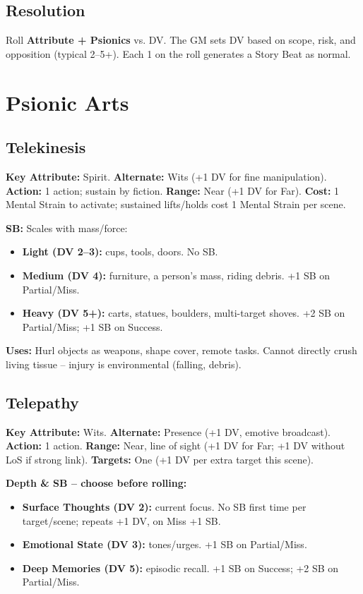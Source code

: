 \documentclass[10pt,a5paper]{book}
\begin{document}
\subsection{Resolution}
Roll \textbf{Attribute + Psionics} vs. DV. The GM sets DV based on scope, risk, and opposition (typical 2--5+). Each 1 on the roll generates a Story Beat as normal.

\section{Psionic Arts}

\subsection{Telekinesis}
\textbf{Key Attribute:} Spirit. \textbf{Alternate:} Wits (+1 DV for fine manipulation). \textbf{Action:} 1 action; sustain by fiction. \textbf{Range:} Near (+1 DV for Far). \textbf{Cost:} 1 Mental Strain to activate; sustained lifts/holds cost 1 Mental Strain per scene.

\textbf{SB:} Scales with mass/force:
\begin{itemize}
    \item \textbf{Light (DV 2--3):} cups, tools, doors. No SB.
    \item \textbf{Medium (DV 4):} furniture, a person's mass, riding debris. +1 SB on Partial/Miss.
    \item \textbf{Heavy (DV 5+):} carts, statues, boulders, multi-target shoves. +2 SB on Partial/Miss; +1 SB on Success.
\end{itemize}

\textbf{Uses:} Hurl objects as weapons, shape cover, remote tasks. Cannot directly crush living tissue -- injury is environmental (falling, debris).

\subsection{Telepathy}
\textbf{Key Attribute:} Wits. \textbf{Alternate:} Presence (+1 DV, emotive broadcast). \textbf{Action:} 1 action. \textbf{Range:} Near, line of sight (+1 DV for Far; +1 DV without LoS if strong link). \textbf{Targets:} One (+1 DV per extra target this scene).

\textbf{Depth \& SB -- choose before rolling:}
\begin{itemize}
    \item \textbf{Surface Thoughts (DV 2):} current focus. No SB first time per target/scene; repeats +1 DV, on Miss +1 SB.
    \item \textbf{Emotional State (DV 3):} tones/urges. +1 SB on Partial/Miss.
    \item \textbf{Deep Memories (DV 5):} episodic recall. +1 SB on Success; +2 SB on Partial/Miss.
\end{itemize}
\end{document}
